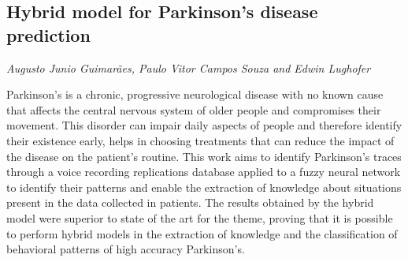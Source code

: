 \documentclass[../booklet.tex]{subfiles}
\begin{document}
\subsection[Hybrid model for Parkinson's disease prediction. {\it Augusto Junio Guimarães, Paulo Vitor Campos Souza and Edwin Lughofer}]{Hybrid model for Parkinson's disease prediction}
  

\begin{center}
  {\it Augusto Junio Guimarães, Paulo Vitor Campos Souza and Edwin Lughofer}
\end{center}



Parkinson's is a chronic, progressive neurological disease with no known cause that affects the central nervous system of older people and compromises their movement. This disorder can impair daily aspects of people and therefore identify their existence early, helps in choosing treatments that can reduce the impact of the disease on the patient's routine. This work aims to identify Parkinson's traces through a voice recording replications database applied to a fuzzy neural network to identify their patterns and enable the extraction of knowledge about situations present in the data collected in patients. The results obtained by the hybrid model were superior to state of the art for the theme, proving that it is possible to perform hybrid models in the extraction of knowledge and the classification of behavioral patterns of high accuracy Parkinson's.

\end{document}
